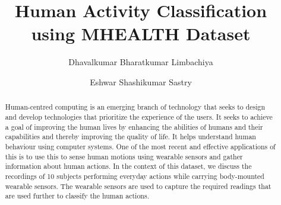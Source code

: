 \documentclass[acmtog]{acmart}
\renewcommand\footnotetextcopyrightpermission[1]{} %
\begin{document}
\title{Human Activity Classification using MHEALTH Dataset}

\author{Dhavalkumar Bharatkumar Limbachiya}
\author{Eshwar Shashikumar Sastry}
\begin{abstract}
 Human-centred computing is an emerging branch of technology that seeks to design and develop technologies that prioritize the experience of the users. It seeks to achieve a goal of improving the human lives by enhancing the abilities of humans and their capabilities and thereby improving the quality of life. It helps understand human behaviour using computer systems. One of the most recent and effective applications of this is to use this to sense human motions using wearable sensors and gather information about human actions. In the context of this dataset, we discuss the recordings of 10 subjects performing everyday actions while carrying body-mounted wearable sensors. The wearable sensors are used to capture the required readings that are used further to classify the human actions.
\end{abstract}

\maketitle
\end{document}
